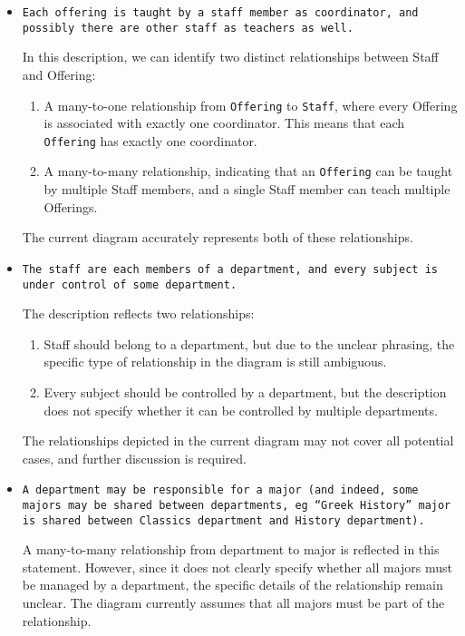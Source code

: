 \documentclass[a4paper,12pt]{article}
\begin{document}
\begin{itemize}
  \item \texttt{Each offering is taught by a staff member as coordinator, and possibly there are other staff as teachers as well. }

  In this description, we can identify two distinct relationships between Staff and Offering:
  \begin{enumerate}
    \item A many-to-one relationship from \texttt{Offering} to \texttt{Staff}, where every Offering is associated with exactly one coordinator. This means that each \texttt{Offering} has exactly one coordinator.

    \item A many-to-many relationship, indicating that an \texttt{Offering} can be taught by multiple Staff members, and a single Staff member can teach multiple Offerings.
  \end{enumerate}

  The current diagram accurately represents both of these relationships.


  \item \texttt{The staff are each members of a department, and every subject is under control of some department.}

  The description reflects two relationships:
    \begin{enumerate}
        \item Staff should belong to a department, but due to the unclear phrasing, the specific type of relationship in the diagram is still ambiguous.

        \item Every subject should be controlled by a department, but the description does not specify whether it can be controlled by multiple departments.
    \end{enumerate}

  The relationships depicted in the current diagram may not cover all potential cases, and further discussion is required.

  \item \texttt{A department may be responsible for a major (and indeed, some majors may be shared between departments, eg “Greek History” major is shared between Classics department and History department).}

  A many-to-many relationship from department to major is reflected in this statement. However, since it does not clearly specify whether all majors must be managed by a department, the specific details of the relationship remain unclear. The diagram currently assumes that all majors must be part of the relationship.


\end{itemize}
\end{document}
